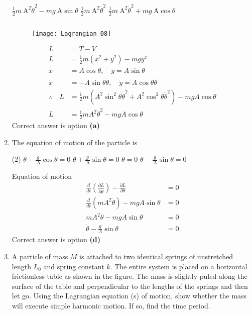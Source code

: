 \begin{enumerate}
\begin{tasks}
	\task[\textbf{b.}]$\frac{1}{2} m \mathrm{~A}^{2} \dot{\theta}^{2}-m g \mathrm{~A} \sin \theta$
	\task[\textbf{c.}] $\frac{1}{2} m \mathrm{~A}^{2} \dot{\theta}^{2}$
	\task[\textbf{d.}] $\frac{1}{2} m \mathrm{~A}^{2} \dot{\theta}^{2}+m g \mathrm{~A} \cos \theta$
\end{tasks}
\begin{answer}$\left. \right. $
	\begin{figure}[H]
		\centering
		\texttt{[image: Lagrangian 08]}
	\end{figure}
	\begin{align*}
	L&=T-V\\
	L&=\frac{1}{2} m\left(\dot{x}^{2}+\dot{y}^{2}\right)-m g y^{x}\\
	x&=A \cos \theta, \quad y=A \sin \theta\\
	\dot{x}&=-A \sin \theta \dot{\theta}, \quad \dot{y}=A \cos \theta \dot{\theta}\\
	 \therefore \quad L &=\frac{1}{2} m\left(A^{2} \sin ^{2} \theta \dot{\theta}^{2}+A^{2} \cos ^{2} \theta \dot{\theta}^{2}\right)-m g A \cos \theta \\ L &=\frac{1}{2} m A^{2} \dot{\theta}^{2}-m g A \cos \theta 
	\end{align*}
	 Correct answer is option \textbf{(a)}
\end{answer}
\item The equation of motion of the particle is
 \begin{tasks}(2)
	\task[\textbf{a.}]$\ddot{\theta}-\frac{g}{\mathrm{~A}} \cos \theta=0$
	\task[\textbf{b.}]$\ddot{\theta}+\frac{g}{\mathrm{~A}} \sin \theta=0$
	\task[\textbf{c.}] $\ddot{\theta}=0$
	\task[\textbf{d.}]  $\ddot{\theta}-\frac{g}{\mathrm{~A}} \sin \theta=0$
\end{tasks}
\begin{answer}
	Equation of motion
	\begin{align*}
	\frac{d}{d t}\left(\frac{\partial L}{\partial \dot{\theta}}\right)-\frac{\partial L}{\partial \theta}&=0\\
	\frac{d}{d t}\left(m A^{2} \dot{\theta}\right)-m g A \sin \theta&=0\\
	m A^{2} \ddot{\theta}-m g A \sin \theta&=0\\
	\ddot{\theta}-\frac{g}{A} \sin \theta&=0
	\end{align*}
	Correct answer is option \textbf{(d)}
\end{answer}
\item A particle of mass $M$ is attached to two identical springs of unstretched length $L_{0}$ and spring constant $k$. The entire system is placed on a horizontal frictionless table as shown in the figure. The mass is slightly puled along the surface of the table and perpendicular to the lengths of the springs and then let go. Using the Lagrangian equation (s) of motion, show whether the mass will execute simple harmonic motion. If so, find the time period.

\end{enumerate}
